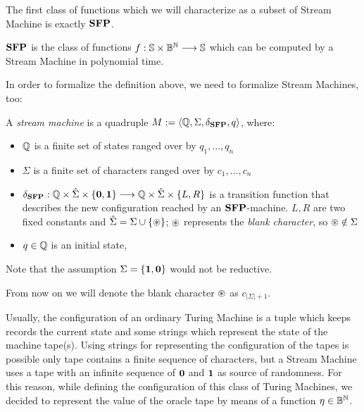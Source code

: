 \begin{conditional}{\notappendix}
  The first class of functions which we will characterize as a subset of Stream
  Machine is exactly $\mathbf{SFP}$.

  \begin{defn}
    $\mathbf{SFP}$ is the class of functions $f: \mathbb{S}\times \mathbb{B}^{\mathbb{N}} \longrightarrow \mathbb{S}$ which can
    be computed by a Stream Machine in polynomial time.
  \end{defn}

  In order to formalize the definition above, we need to formalize Stream Machines, too:





    \begin{defn}
    A \emph{stream machine} is a quadruple
    $M:= \langle \mathbb{Q},\Sigma, \delta_{\mathbf{SFP}},q\rangle$,
    where:
    \begin{itemize}
    \itemsep0em
    \item $\mathbb{Q}$ is a finite set of states ranged over by
    $q_1,\dots, q_n$
    \item $\Sigma$ is a finite set of characters ranged
    over by $c_1,\dots, c_n$
    \item $\delta_{\mathbf{SFP}}:\mathbb{Q} \times \hat{\Sigma} \times
    \{\mathbf{0}, \mathbf{1}\} \longrightarrow \mathbb{Q}
    \times \hat{\Sigma} \times \{L,R\}$
    is a transition function that describes the new configuration
    reached by an $\mathbf{SFP}$-machine.
    $L,R$ are two fixed constants and
    $\hat{\Sigma}=\Sigma\cup \{\circledast\}$;
    $\circledast$ represents the \emph{blank character}, so
    $\circledast\notin \Sigma$
    \item $q\in \mathbb{Q}$ is an initial state,
    \end{itemize}
    Note that the assumption $\Sigma=\{\mathbf{1},\mathbf{0}\}$
    would not be reductive.
    \end{defn}

    \begin{notation}
    From now on we will denote the blank character
    $\circledast$ as $c_{|\Sigma|+1}$.
    \end{notation}

    Usually, the configuration of an ordinary Turing Machine is a tuple
    which keeps records the current state and some strings which represent the
    state of the machine tape(s). Using strings for representing
    the configuration of the tapes is possible only tape contains a finite
    sequence of characters, but a Stream Machine uses a tape with an infinite
    sequence of $\mathbf{0}$ and $\mathbf{1}$ as source of randomness.
    For this reason, while defining the configuration
    of this class of Turing Machines, we decided to represent the value of the
    oracle tape by means of a function $\eta \in \mathbb{B}^{\mathbb{N}}$.



\end{conditional}
